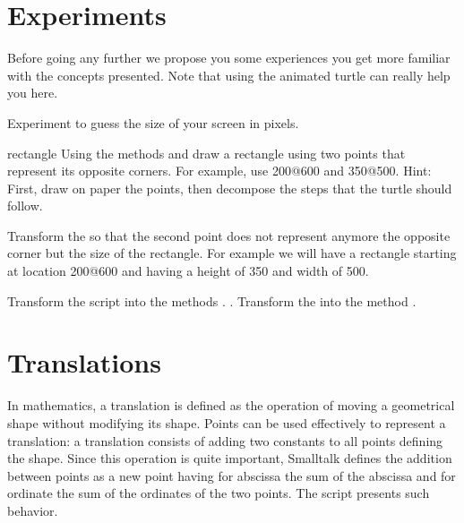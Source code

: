 \section{Experiments}
Before going any further we propose you some experiences you get more familiar with the concepts presented. Note that 
using the animated turtle can really help you here. 

\begin{exonofig}
Experiment to guess the size of your screen in pixels.
\end{exonofig}

\begin{exofig}{rectangle} \label{exo:rectangle}
Using the methods \goat and \jumpat draw a rectangle using two points that represent its opposite corners. 
For example, use 200@600 and 350@500.
Hint: First, draw on paper the points, then decompose the steps that the turtle should follow. 
\end{exofig}


\begin{exonofig}\label{exo:rectangle2}
Transform the  so that the second point does not represent anymore the opposite corner but the size of the rectangle. For example we will have a rectangle starting at location 200@600 and having a height of 350 and width of 500. \end{exonofig}

\begin{exonofig}
Transform the script  into the methods . .
Transform the  into the method . 
\end{exonofig}


\section{Translations}
In mathematics, a translation is defined as the operation of
moving a geometrical shape without modifying its shape. Points can
be used effectively to represent a translation: a translation
consists of adding two constants to all points defining the shape.
Since this operation is quite important, Smalltalk defines the
addition between points as a new point having for abscissa the sum
of the abscissa and for ordinate the sum of the ordinates of the
two points. The script  presents such behavior.

